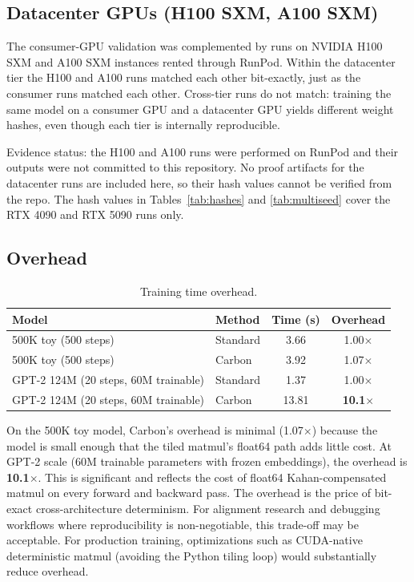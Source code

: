 \documentclass[11pt,a4paper]{article}
\begin{document}
\subsection{Datacenter GPUs (H100 SXM, A100 SXM)}
\label{sec:datacenter}

The consumer-GPU validation was complemented by runs on NVIDIA H100 SXM and
A100 SXM instances rented through RunPod. Within the datacenter tier the H100
and A100 runs matched each other bit-exactly, just as the consumer runs
matched each other. Cross-tier runs do not match: training the same model on
a consumer GPU and a datacenter GPU yields different weight hashes, even
though each tier is internally reproducible.

Evidence status: the H100 and A100 runs were performed on RunPod and their
outputs were not committed to this repository. No proof artifacts for the
datacenter runs are included here, so their hash values cannot be verified
from the repo. The hash values in Tables~\ref{tab:hashes} and
\ref{tab:multiseed} cover the RTX 4090 and RTX 5090 runs only.

\subsection{Overhead}

\begin{table}[h]
\centering
\caption{Training time overhead.}
\begin{tabular}{llcc}
\toprule
Model & Method & Time (s) & Overhead \\
\midrule
500K toy (500 steps) & Standard & 3.66 & 1.00$\times$ \\
500K toy (500 steps) & Carbon & 3.92 & 1.07$\times$ \\
\midrule
GPT-2 124M (20 steps, 60M trainable) & Standard & 1.37 & 1.00$\times$ \\
GPT-2 124M (20 steps, 60M trainable) & Carbon & 13.81 & \textbf{10.1$\times$} \\
\bottomrule
\end{tabular}
\end{table}

On the 500K toy model, Carbon's overhead is minimal (1.07$\times$) because
the model is small enough that the tiled matmul's float64 path adds little
cost. At GPT-2 scale (60M trainable parameters with frozen embeddings),
the overhead is \textbf{10.1$\times$}. This is significant and reflects
the cost of float64 Kahan-compensated matmul on every forward and backward
pass. The overhead is the price of bit-exact cross-architecture determinism.
For alignment research and debugging workflows where reproducibility is
non-negotiable, this trade-off may be acceptable. For production training,
optimizations such as CUDA-native deterministic matmul (avoiding the Python
tiling loop) would substantially reduce overhead.
\end{document}
